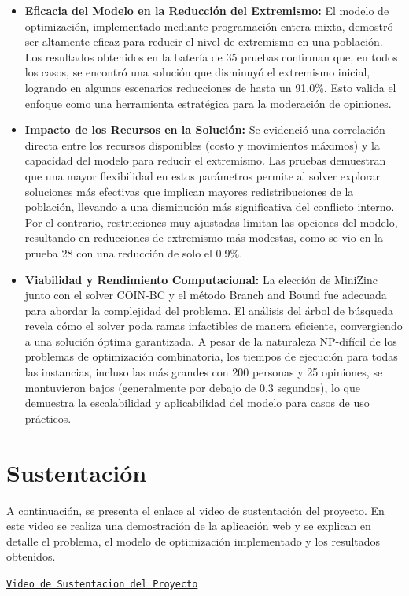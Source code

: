 \documentclass[11pt,letter]{article}
\begin{document}
\begin{itemize}
    \item \textbf{Eficacia del Modelo en la Reducción del Extremismo:} El modelo de optimización, implementado mediante programación entera mixta, demostró ser altamente eficaz para reducir el nivel de extremismo en una población. Los resultados obtenidos en la batería de 35 pruebas confirman que, en todos los casos, se encontró una solución que disminuyó el extremismo inicial, logrando en algunos escenarios reducciones de hasta un 91.0\%. Esto valida el enfoque como una herramienta estratégica para la moderación de opiniones.


    \item \textbf{Impacto de los Recursos en la Solución:} Se evidenció una correlación directa entre los recursos disponibles (costo y movimientos máximos) y la capacidad del modelo para reducir el extremismo. Las pruebas demuestran que una mayor flexibilidad en estos parámetros permite al solver explorar soluciones más efectivas que implican mayores redistribuciones de la población, llevando a una disminución más significativa del conflicto interno. Por el contrario, restricciones muy ajustadas limitan las opciones del modelo, resultando en reducciones de extremismo más modestas, como se vio en la prueba 28 con una reducción de solo el 0.9\%.

    \item \textbf{Viabilidad y Rendimiento Computacional:} La elección de MiniZinc junto con el solver COIN-BC y el método Branch and Bound fue adecuada para abordar la complejidad del problema. El análisis del árbol de búsqueda revela cómo el solver poda ramas infactibles de manera eficiente, convergiendo a una solución óptima garantizada. A pesar de la naturaleza NP-difícil de los problemas de optimización combinatoria, los tiempos de ejecución para todas las instancias, incluso las más grandes con 200 personas y 25 opiniones, se mantuvieron bajos (generalmente por debajo de 0.3 segundos), lo que demuestra la escalabilidad y aplicabilidad del modelo para casos de uso prácticos.
\end{itemize}

\section{Sustentación}

A continuación, se presenta el enlace al video de sustentación del proyecto. En este video se realiza una demostración de la aplicación web y se explican en detalle el problema, el modelo de optimización implementado y los resultados obtenidos.

\vspace{1cm}

\begin{center}
    \href{https://drive.google.com/file/d/1n1nj8be4HFs8x6auUjzf9EMFuxjoCUNe/view?usp=sharing}{\nolinkurl{Video de Sustentacion del Proyecto}}
\end{center}


\newpage
\nocite{*}
\printbibliography
\end{document}

